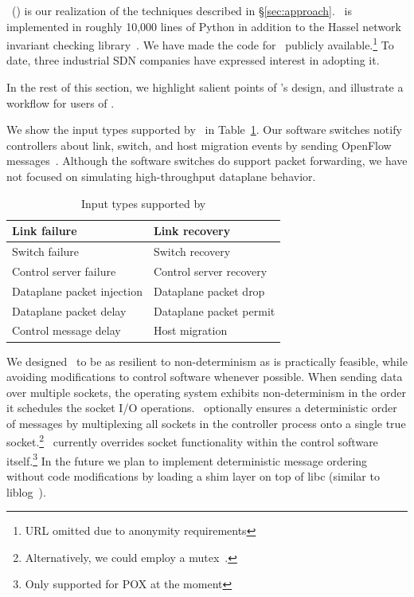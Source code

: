\projectname~(\projectmeaning) is our realization of the techniques described in
\S\ref{sec:approach}. \projectname~is implemented in roughly 10,000 lines of Python in
addition to the Hassel network invariant checking library~\cite{hsa}. We have
made the code
for \projectname~publicly available.\footnote{URL omitted due to anonymity requirements}
To date, three industrial SDN companies have expressed interest in adopting it.

In the rest of this section, we highlight salient points of \projectname's
design, and illustrate a workflow for users of \projectname.

We show the input types supported by \projectname~in Table~\ref{tab:inputs}.
Our software switches notify controllers about link, switch, and host migration events
by sending OpenFlow messages~\cite{openflow}.
Although the software switches do support packet forwarding, we
have not focused on simulating high-throughput dataplane behavior.

\begin{table}
\centering
\begin{tabular}{|l|l|}
\hline
Link failure & Link recovery \\
\hline
Switch failure & Switch recovery \\
\hline
Control server failure & Control server recovery \\
\hline
Dataplane packet injection & Dataplane packet drop \\
\hline
Dataplane packet delay & Dataplane packet permit \\
\hline
Control message delay & Host migration \\
\hline
\end{tabular}
\caption{Input types supported by \projectname}
\label{tab:inputs}
\end{table}

We designed \projectname~to be as resilient to non-determinism as is
practically feasible, while avoiding modifications to control software whenever possible.
When sending data over multiple sockets, the operating system exhibits
non-determinism in the order it schedules the socket I/O operations.
\projectname~optionally ensures a deterministic order of messages
by multiplexing all sockets in the controller process
onto a single true socket.\footnote{Alternatively, we could employ a
mutex~\cite{lin2009towards}.}
\projectname~currently overrides socket functionality within the control
software itself.\footnote{Only supported for POX at the moment}
In the future we plan to implement deterministic message ordering without code modifications by
loading a shim layer on top of
libc (similar to liblog~\cite{Geels:2006:RDD:1267359.1267386}).

